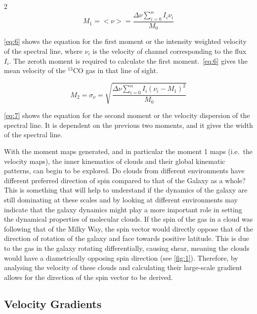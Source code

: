 \documentclass[a4paper,11pt]{article}
\begin{document}
\begin{multicols}{2}
\begin{equation}
  M_1 = <\!\nu\!> = \dfrac{\Delta\nu\sum\limits_{i=0}^{n} I_i \nu_i}{M_0}\label{eq:6}
  \tag{6}
\end{equation}

\par\noindent \autoref{eq:6} shows the equation for the first moment or the intensity weighted velocity of the spectral line, where $\nu_i$ is the velocity of channel corresponding to the flux $I_i$. The zeroth moment is required to calculate the first moment.\ \autoref{eq:6} gives the mean velocity of the $^{13}$CO gas in that line of sight. 

\begin{equation}
  M_2 = \sigma_\nu = \sqrt{\dfrac{\Delta\nu\sum\limits_{i=0}^{n} I_i{\left(\nu_i-M_1\right)}^{2}}{M_0}}\label{eq:7}
  \tag{7}
\end{equation}

\par\noindent \autoref{eq:7} shows the equation for the second moment or the velocity dispersion of the spectral line. It is dependent on the previous two moments, and it gives the width of the spectral line.
\smallskip
\par\noindent With the moment maps generated, and in particular the moment 1 maps (i.e.\ the velocity maps), the inner kinematics of clouds and their global kinematic patterns, can begin to be explored. Do clouds from different environments have different preferred direction of spin compared to that of the Galaxy as a whole? This is something that will help to understand if the dynamics of the galaxy are still dominating at these scales and by looking at different environments may indicate that the galaxy dynamics might play a more important role in setting the dynamical properties of molecular clouds. If the spin of the gas in a cloud was following that of the Milky Way, the spin vector would directly oppose that of the direction of rotation of the galaxy and face towards positive latitude. This is due to the gas in the galaxy rotating differentially, causing shear, meaning the clouds would have a diametrically opposing spin direction (see \autoref{fig:1}). Therefore, by analysing the velocity of these clouds and calculating their large-scale gradient allows for the direction of the spin vector to be derived. 

\subsection*{Velocity Gradients}


\end{multicols}
\end{document}
